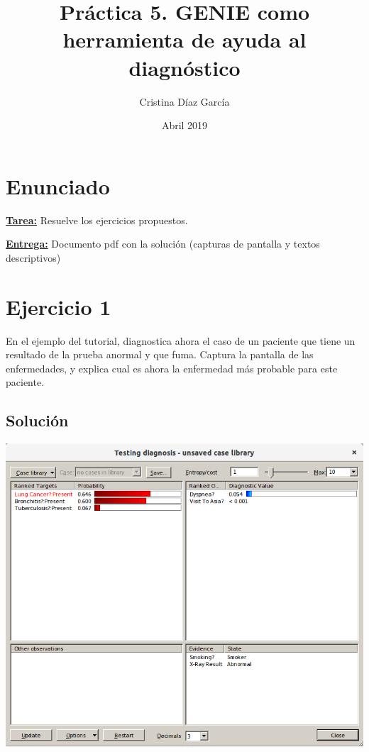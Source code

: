\documentclass{article}
\title{Práctica 5. GENIE como herramienta de ayuda al diagnóstico}
\author{Cristina Díaz García}
\date{Abril 2019}
\begin{document}

\begin{titlingpage}
\maketitle
\end{titlingpage}

\newpage

\tableofcontents

\newpage

\section{Enunciado}

\textbf{\underline{Tarea:}} Resuelve los ejercicios propuestos. 

\textbf{\underline{Entrega:}} Documento pdf con la solución (capturas de pantalla y textos descriptivos)

\section{\textbf{Ejercicio 1}}

En el ejemplo del tutorial, diagnostica ahora el caso de un paciente que tiene un resultado de la prueba anormal y que fuma. Captura la pantalla de las enfermedades, y explica cual es ahora la enfermedad más probable para este paciente.

\subsection{Solución}

\begin{center}
\includegraphics[scale=0.5]{asia.png}
\end{center}
\end{document}
